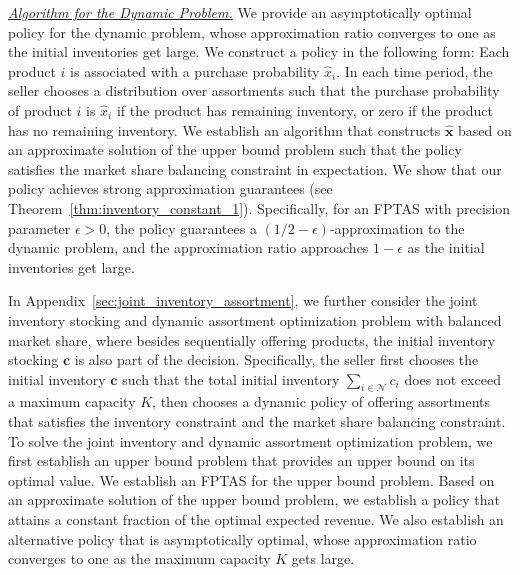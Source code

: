 \documentclass[mnsc,non-blindrev]{informs3}
\theoremstyle{definition}
\begin{document}
 \noindent\underline{\it Algorithm for the Dynamic Problem.} We provide an asymptotically optimal policy for the dynamic problem, whose approximation ratio converges to one as the initial inventories get large. We construct a policy in the following form: Each product $i$ is associated with a purchase probability $\hat{x}_i$. In each time period, the seller chooses a distribution over assortments such that the purchase probability of product $i$ is $\hat{x}_i$ if the product has remaining inventory, or zero if the product has no remaining inventory. We establish an algorithm that constructs $\hat{\bm{x}}$ based on an approximate solution of the upper bound problem such that the policy satisfies the market share balancing constraint in expectation. 
 We show that our policy achieves strong approximation guarantees (see Theorem~\ref{thm:inventory_constant_1}). Specifically, for an FPTAS with precision parameter $\epsilon>0$, the policy guarantees a $(1/2 - \epsilon)$-approximation to the dynamic problem, and the approximation ratio approaches $1 - \epsilon$ as the initial inventories get large. 
 
 {  In Appendix~\ref{sec:joint_inventory_assortment}, we further consider the joint inventory stocking and dynamic assortment optimization problem with balanced market share, where besides sequentially offering products, the initial inventory stocking $\bm{c}$ is also part of the decision. Specifically, the seller first chooses the initial inventory $\bm{c}$ such that the total initial inventory $\sum_{i\in \mathcal{N}}c_i$ does not exceed a maximum capacity $K$, then chooses a dynamic policy of offering assortments that satisfies the inventory constraint and the market share balancing constraint. To solve the joint inventory and dynamic assortment optimization problem, we first establish an upper bound problem that provides an upper bound on its optimal value. We establish an FPTAS for the upper bound problem. Based on an approximate solution of the upper bound problem, we establish a policy that attains a constant fraction of the optimal expected revenue. We also establish an alternative policy that is asymptotically optimal, whose approximation ratio converges to one as the maximum capacity $K$ gets large.}

 
 
\end{document}
